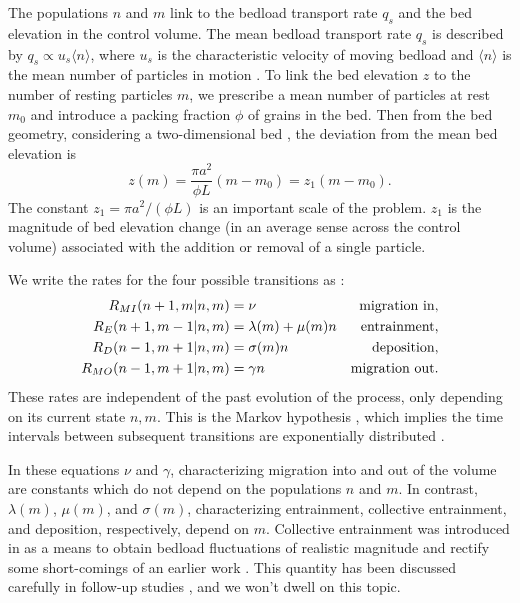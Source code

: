 \documentclass[draft]{agujournal2018}
\newcommand\be{\begin{equation}} %
\newcommand\ee{\end{equation}}   %
\newcommand\bra{\langle}
\newcommand\ket{\rangle}
\begin{document}
The populations $n$ and $m$ link to the bedload transport rate $q_s$ and the bed elevation in the control volume.
The mean bedload transport rate $q_s$ is described by $q_s \propto u_s \bra n \ket$, where $u_s$ is the characteristic velocity of moving bedload and $\bra n \ket $ is the mean number of particles in motion \citep[e.g.][]{Charru2004, Ancey2008, Furbish2012a}.
To link the bed elevation $z$ to the number of resting particles $m$, we prescribe a mean number of particles at rest $m_0$ and introduce a packing fraction $\phi$ of grains in the bed.
Then from the bed geometry, considering a two-dimensional bed \citep[e.g.][]{Einstein1950, Paintal1971}, the deviation from the mean bed elevation is
\be z(m) = \frac{\pi a^2}{\phi L}(m-m_0) = z_1(m-m_0). \label{eq:ele}\ee
The constant $z_1 = \pi a^2/(\phi L)$ is an important scale of the problem. 
$z_1$ is the magnitude of bed elevation change (in an average sense across the control volume) associated with the addition or removal of a single particle. 

We write the rates for the four possible transitions as \citep[e.g.][]{Ancey2008}:
\begin{align}
 R_{MI}(n+1,m| n, m) &= \nu & \text{migration in}, \label{eq:rate1}\\
 R_E(n+1,m-1|n,m)  &= \lambda(m) + \mu(m) n  & \text{entrainment},  \label{eq:rate2}\\
 R_D(n-1,m+1|n,m) &= \sigma(m) n & \text{deposition},\label{eq:rate3}\\
 R_{MO}(n-1,m+1|n,m) &= \gamma n & \text{migration out\label{eq:rate4}}.
\end{align}
These rates are independent of the past evolution of the process, only depending on its current state $n,m$. 
This is the Markov hypothesis \citep[e.g.][]{Cox1965}, which implies the time intervals between subsequent transitions are exponentially distributed \citep[e.g.][]{Gillespie2007}.

In these equations $\nu$ and $\gamma$, characterizing migration into and out of the volume are constants which do not depend on the populations $n$ and $m$.
In contrast, $\lambda(m)$, $\mu(m)$, and $\sigma(m)$, characterizing entrainment, collective entrainment, and deposition, respectively, depend on $m$.
Collective entrainment was introduced in \citet{Ancey2008} as a means to obtain bedload fluctuations of realistic magnitude and rectify some short-comings of an earlier work \citep{Ancey2006}.
This quantity has been discussed carefully in follow-up studies \citep[e.g.][]{Heyman2013, Heyman2014, Ma2014, Ancey2014a}, and we won't dwell on this topic.
\end{document}
